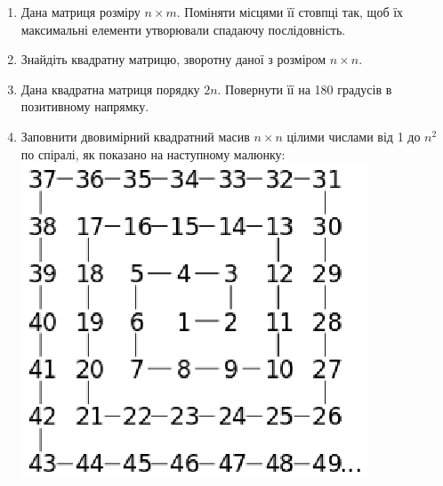 \documentclass[]{article}
\makeatletter
\newcommand{\xslalph}[1]{\expandafter\@xslalph\csname c@#1\endcsname}
\newcommand{\@xslalph}[1]{%
    \ifcase#1\or а\or б\or в\or г\or д\or e\or є\or ж\or з\or i%
    \or й\or к\or л\or м\or н\or о\or п\or р\or с\or т%
    \or у\or ф\or х\or ц\or ч\or ш\or ю\or я\or аа\or бб\or вв%
    \else\@ctrerr\fi%
}
\makeatother
\begin{document}
\begin{enumerate}
\begin{enumerate}[label=\xslalph*)]
\begin{enumerate}
\begin{enumerate}[label=\xslalph*)]
\begin{enumerate}
\def\labelenumi{\arabic{enumi})}
\item
  Дана матриця розміру $n \times m$. Поміняти місцями її стовпці так, щоб їх
  максимальні елементи утворювали спадаючу послідовність.
\item
  Знайдіть квадратну матрицю, зворотну даної з розміром $n \times n$.
\item
  Дана квадратна матриця порядку $2n$. Повернути її на 180 градусів в
  позитивному напрямку.
 \newpage
\item
  Заповнити двовимірний квадратний масив $n\times n$ цілими числами від 1 до $n^2$ по
  спіралі, як показано на наступному малюнку:\\
  \includegraphics{spiral5}
   

\end{enumerate}
\end{enumerate}
\end{enumerate}
\end{enumerate}
\end{enumerate}
\end{document}
